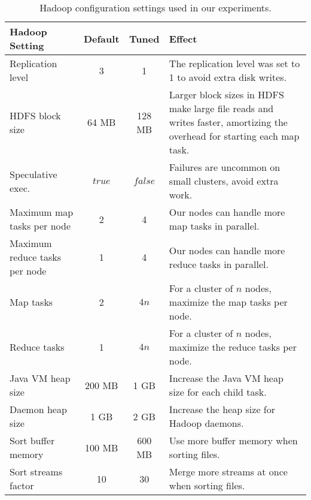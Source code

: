 {
\renewcommand{\baselinestretch}{1.0}
\begin{table}
\centering
\begin{minipage}{1\textwidth}
\centering
\renewcommand{\arraystretch}{1.2}
\begin{tabular}{|p{3.0cm}|c|c|p{9.4cm}|}
\hline
Hadoop Setting & Default & Tuned & Effect \\ \hline
Replication level & 3 & 1 & The replication level was set to 1 to
avoid extra disk writes. \\ \hline
HDFS block size & 64 MB & 128 MB & Larger block sizes in HDFS make large file reads and writes faster, amortizing the overhead for starting each map task. \\ \hline
Speculative exec. & $true$ & $false$ & Failures are uncommon on small clusters, avoid extra work. \\ \hline
Maximum map tasks per node  & 2 & 4 & Our nodes can handle more map
tasks in parallel. \\ \hline
Maximum reduce tasks per node & 1 & 4 & Our nodes can handle more
reduce tasks in parallel. \\ \hline
Map tasks & 2 & $4n$ & For a cluster of $n$ nodes, maximize the map tasks per node. \\ \hline
Reduce tasks & 1 & $4n$ & For a cluster of $n$ nodes, maximize the reduce tasks per node. \\ \hline
Java VM heap size & 200 MB & 1 GB & Increase the Java VM heap size for each child task. \\ \hline
Daemon heap size & 1 GB & 2 GB & Increase the heap size for Hadoop daemons. \\ \hline
Sort buffer memory & 100 MB & 600 MB & Use more buffer memory when sorting files.  \\ \hline
Sort streams factor & 10 & 30 & Merge more streams at once when sorting files. \\ \hline
\end{tabular}
\caption{Hadoop configuration settings used in our experiments.
}
\label{table:hadoop:settings}
\end{minipage}
\end{table}
}
